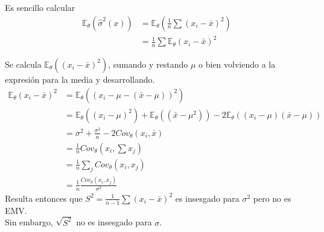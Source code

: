 \documentclass[10pt]{article}
\theoremstyle{plain}
\theoremstyle{definition}
\begin{document}
Es sencillo calcular
\begin{align*}
\mathbb{E}_{\theta}(\hat{\sigma}^2(x)) &= \mathbb{E}_{\theta}(\frac{1}{n}\sum (x_{i}-\bar{x})^2)\\
&= \frac{1}{n}\sum \mathbb{E}_{\theta} (x_{i}-\bar{x})^2
\end{align*}

Se calcula $\mathbb{E}_{\theta}\left((x_{i}-\bar{x})^2\right)$, sumando y restando $\mu$ o bien volviendo a la expresión para la media y desarrollando.
\begin{align*}
\mathbb{E}_{\theta}\left(x_{i}-\bar{x}\right)^2 &= \mathbb{E}_{\theta}\left((x_{i}-\mu - (\bar{x}-\mu))^2\right)\\
&= \mathbb{E}_{\theta}\left((x_{i}-\mu)^2\right) + \mathbb{E}_{\theta}\left((\bar{x}-\mu^2)\right) - 2\mathbb{E}_{\theta}((x_{i}-\mu)(\bar{x}-\mu))\\
&= \sigma^2 + \frac{\sigma^2}{n} - 2 Cov_{\theta}(x_{i},\bar{x})\\
&= \frac{1}{n} Cov_{\theta}(x_{i},\sum x_{j})\\
&= \frac{1}{n} \sum_{j} Cov_{\theta}(x_{i},x_{j})\\
&= \frac{1}{n} \frac{Cov_{\theta}(x_{i},x_{j})}{\sigma^2}
\end{align*}
Resulta entonces que $S^2 = \frac{1}{n-1}\sum (x_{i}-\bar{x})^2$ es insesgado para $\sigma^2$ pero no es EMV.\\
Sin embargo, $\sqrt{S^2}$ no es insesgado para $\sigma$.
\end{document}
